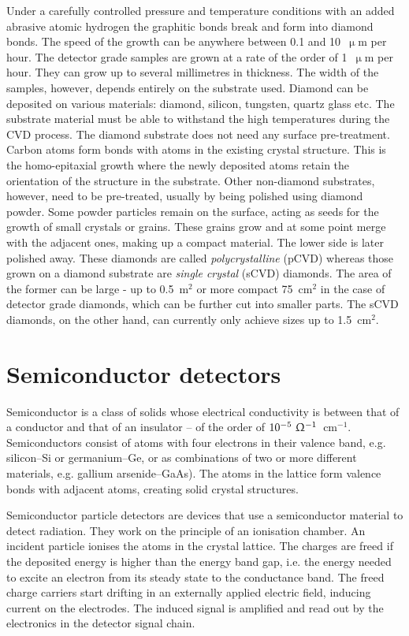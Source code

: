 \begin{description}
Under a carefully controlled pressure and temperature conditions with an added abrasive atomic hydrogen the graphitic bonds break and form into diamond bonds. The speed of the growth can be anywhere between 0.1 and 10~$\upmu$m per hour. The detector grade samples are grown at a rate of the order of 1~$\upmu$m per hour. They can grow up to several millimetres in thickness. The width of the samples, however, depends entirely on the substrate used. Diamond can be deposited on various materials: diamond, silicon, tungsten, quartz glass etc. The substrate material must be able to withstand the high temperatures during the CVD process. The diamond substrate does not need any surface pre-treatment. Carbon atoms form bonds with atoms in the existing crystal structure. This is the homo-epitaxial growth where the newly deposited atoms retain the orientation of the structure in the substrate. Other non-diamond substrates, however, need to be pre-treated, usually by being polished using diamond powder. Some powder particles remain on the surface, acting as seeds for the growth of small crystals or grains. These grains grow and at some point merge with the adjacent ones, making up a compact material. The lower side is later polished away. These diamonds are called \emph{polycrystalline} (pCVD) whereas those grown on a diamond substrate are \emph{single crystal} (sCVD) diamonds. The area of the former can be large - up to 0.5~m$^2$ or more compact 75~cm$^2$ in the case of detector grade diamonds, which can be further cut into smaller parts. The sCVD diamonds, on the other hand, can currently only achieve sizes up to 1.5~cm$^2$.
\end{description}




\section{Semiconductor detectors}
Semiconductor is a class of solids whose electrical conductivity is between that of a conductor and that of an insulator -- of the order of  $10^{-5}~\Upomega^{-1}$~cm$^{-1}$. Semiconductors consist of atoms with four electrons in their valence band, e.g. silicon--Si or germanium--Ge, or as combinations of two or more different materials, e.g. gallium arsenide--GaAs). The atoms in the lattice form valence bonds with adjacent atoms, creating solid crystal structures.

Semiconductor particle detectors are devices that use a semiconductor material to detect radiation. They work on the principle of an ionisation chamber. An incident particle ionises the atoms in the crystal lattice. The charges are freed if the deposited energy is higher than the energy band gap, i.e. the energy needed to excite an electron from its steady state to the conductance band. The freed charge carriers start drifting in an externally applied electric field, inducing current on the electrodes. The induced signal is amplified and read out by the electronics in the detector signal chain.

